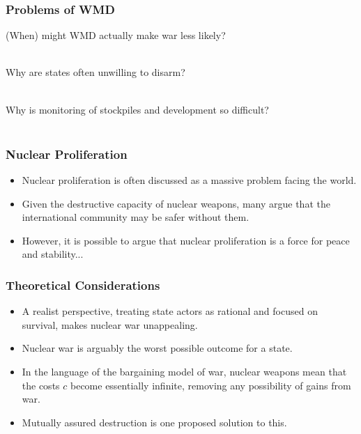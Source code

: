 \documentclass{beamer}
\begin{document}
\begin{frame} 
\frametitle{\LARGE{Problems of WMD}}
\begin{itemize}
	\Large{
		\item (When) might WMD actually make war less likely? \pause
		\\~\\ 
		\item Why are states often unwilling to disarm? \pause
		\\~\\ 
		\item Why is monitoring of stockpiles and development so difficult? 
		\\~\\

	}
\end{itemize}
\end{frame}

\begin{frame} 
\frametitle{\LARGE{Nuclear Proliferation}}
\begin{itemize}

		\item Nuclear proliferation is often discussed as a massive problem facing the world. \pause
		\item Given the destructive capacity of nuclear weapons, many argue that the international community may be safer without them. \pause
		\item However, it is possible to argue that nuclear proliferation is a force for peace and stability...
	
\end{itemize}
\end{frame}

\begin{frame} 
\frametitle{\LARGE{Theoretical Considerations}}
\begin{itemize}

		\item A realist perspective, treating state actors as rational and focused on survival, makes nuclear war unappealing. \pause
		\item Nuclear war is arguably the worst possible outcome for a state. \pause
		\item In the language of the bargaining model of war, nuclear weapons mean that the costs $c$ become essentially infinite, removing any possibility of gains from war.
		\item Mutually assured destruction is one proposed solution to this.
	
\end{itemize}
\end{frame}
\end{document}
